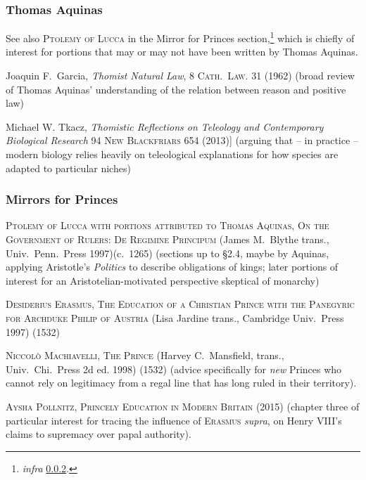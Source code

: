 \documentclass[../FGP.tex]{subfiles}
\begin{document}
\subsubsection{Thomas Aquinas}\label{biblio:thomas}
See also \textsc{Ptolemy of Lucca} in the Mirror for Princes section,\footnote{\textit{infra} \ref{biblio:mirrorforprinces}.} which is chiefly of interest for portions that may or may not have been written by Thomas Aquinas.
\begin{annotated-bibliography}
  \item Joaquin F.~Garcia, \textit{Thomist Natural Law}, 8 \textsc{Cath.~Law.} 31 (1962) (broad review of Thomas Aquinas' understanding of the relation between reason and positive law)
  \item Michael W. Tkacz, \textit{Thomistic Reflections on Teleology and Contemporary Biological Research} 94 \textsc{New Blackfriars} 654 (2013)] (arguing that -- in practice -- modern biology relies heavily on teleological explanations for how species are adapted to particular niches)
\end{annotated-bibliography}
\subsubsection{Mirrors for Princes}\label{biblio:mirrorforprinces}
\begin{annotated-bibliography}
  \item \textsc{Ptolemy of Lucca with portions attributed to Thomas Aquinas}, \textsc{On the Government of Rulers: De Regimine Principum} (James M.~Blythe trans., Univ.~Penn.~Press 1997)(c.~1265) (sections up to \S2.4, maybe by Aquinas, applying Aristotle's \textit{Politics} to describe obligations of kings; later portions of interest for an Aristotelian-motivated perspective skeptical of monarchy)
  \item \textsc{Desiderius Erasmus}, \textsc{The Education of a Christian Prince with the Panegyric for Archduke Philip of Austria} (Lisa Jardine trans., Cambridge Univ.~Press 1997) (1532) 
  \item \textsc{Niccolò Machiavelli, The Prince} (Harvey C.~Mansfield, trans., Univ.~Chi.~Press 2d ed. 1998) (1532) (advice specifically for \emph{new} Princes who cannot rely on legitimacy from a regal line that has long ruled in their territory).
  \item \textsc{Aysha Pollnitz}, \textsc{Princely Education in Modern Britain} (2015) (chapter three of particular interest for tracing the influence of \textsc{Erasmus} \textit{supra}, on Henry VIII's claims to supremacy over papal authority).
\end{annotated-bibliography}
\end{document}
